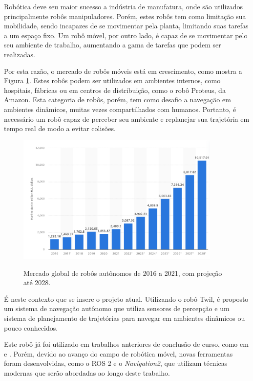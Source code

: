 \documentclass[repeatfields,xlists,xpacks,oneside,yearsonly]{ufrgscca}
\begin{document}
Robótica deve seu maior sucesso a indústria de manufatura, onde são utilizados
principalmente robôs manipuladores\cite{IntroductionToMobileRobots}.
Porém, estes robôs tem como limitação sua mobilidade, sendo incapazes de se movimentar
pela planta, limitando suas tarefas a um espaço fixo.
Um robô móvel, por outro lado, é capaz de se movimentar pelo seu ambiente de
trabalho, aumentando a gama de tarefas que podem ser realizadas.

Por esta razão, o mercado de robôs móveis está em crescimento, como mostra a
Figura \ref{fig:mercado_robo}.
Estes robôs podem ser utilizados em ambientes internos, como hospitais, fábricas
ou em centros de distribuição, como o robô Proteus, da Amazon\cite{amazon_robot}.
Esta categoria de robôs, porém, tem como desafio a navegação em ambientes dinâmicos,
muitas vezes compartilhados com humanos.
Portanto, é necessário um robô capaz de perceber seu ambiente e replanejar sua
trajetória em tempo real de modo a evitar colisões.

\begin{figure}[htbp]
    {
        \centering
        \caption{Mercado global de robôs autônomos de 2016 a 2021, com projeção até 2028.}
        \label{fig:mercado_robo}
        \includegraphics[width=0.9\textwidth]{mercado_robo}\\
    }
    {}
\end{figure}

É neste contexto que se insere o projeto atual.
Utilizando o robô Twil, é proposto um sistema de navegação autônomo que utiliza
sensores de percepção e um sistema de planejamento de trajetórias para navegar
em ambientes dinâmicos ou pouco conhecidos.

Este robô já foi utilizado em trabalhos anteriores de conclusão de curso,
como em \textcite{petry_tcc} e \textcite{rahul_tcc}.
Porém, devido ao avanço do campo de robótica móvel, novas ferramentas
foram desenvolvidas, como o ROS 2 e o \textit{Navigation2}, que utilizam
técnicas modernas que serão abordadas ao longo deste trabalho.
\end{document}
